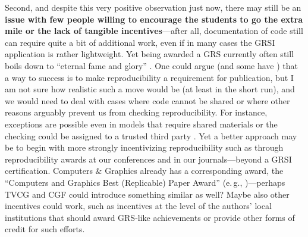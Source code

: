 \documentclass[conference,svgnames]{vgtc}                     %
\newcommand{\eg}{e.\,g.}
\begin{document}
Second, and despite this very positive observation just now, there may still be an \textbf{issue with few people willing to encourage the students to go the extra mile or the lack of tangible incentives}---after all, documentation of code still can require quite a bit of additional work, even if in many cases the GRSI application is rather lightweight. Yet being awarded a GRS currently often still boils down to ``eternal fame and glory'' \cite{Isenberg:2022:PEP}. One could argue (and some have \cite{Haroz:2018:OPV}) that a way to success is to make reproducibility a requirement for publication, but I am not sure how realistic such a move would be (at least in the short run), and we would need to deal with cases where code cannot be shared or where other reasons arguably prevent us from checking reproducibility. For instance, exceptions are possible even in models that require shared materials \cite{Haroz:2018:OPV} or the checking could be assigned to a trusted third party \cite{Besancon:2021:OSS}. Yet a better approach may be to begin with more strongly incentivizing reproducibility such as through reproducibility awards at our conferences and in our journals---beyond a GRSI certification. Computers \& Graphics already has a corresponding award, the ``Computers and Graphics Best (Replicable) Paper Award'' \cite{Jorge:2020:NEC} (\eg, \cite{Glencross:2021:GBP,Glencross:2022:GBP})---perhaps TVCG and CGF could introduce something similar as well? Maybe also other incentives could work, such as incentives at the level of the authors' local institutions that should award GRS-like achievements or provide other forms of credit for such efforts.
\end{document}
